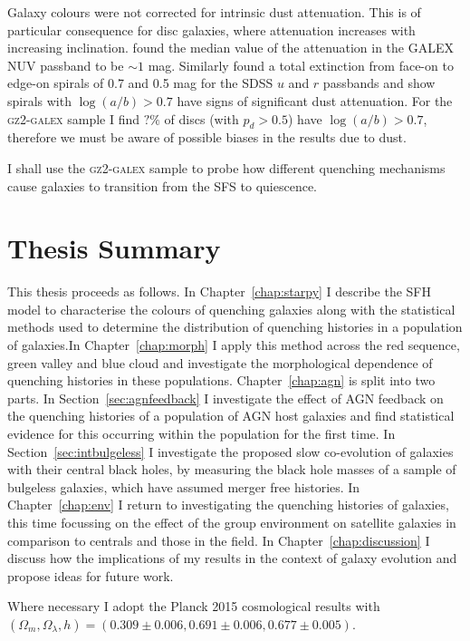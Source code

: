 Galaxy colours were not corrected for intrinsic dust attenuation. This is of particular consequence for disc galaxies, where attenuation increases with increasing inclination. \cite{Buat05} found the median value of the attenuation in the GALEX NUV passband to be $\sim 1$ mag. Similarly \cite{masters10a} found a total extinction from face-on to edge-on spirals of 0.7 and 0.5 mag for the SDSS $u$ and $r$ passbands and show spirals with $\log(a/b) > 0.7$ have signs of significant dust attenuation. For the \textsc{gz2-galex} sample I find $?\%$ of discs (with $p_d > 0.5$) have $\log(a/b) > 0.7$, therefore we must be aware of possible biases in the results due to dust. 

I shall use the \textsc{gz2-galex} sample to probe how different quenching mechanisms cause galaxies to transition from the SFS to quiescence. 


\section{Thesis Summary}\label{sec:thesissum}


This thesis proceeds as follows. In Chapter~\ref{chap:starpy} I describe the SFH model to characterise the colours of quenching galaxies along with the statistical methods used to determine the distribution of quenching histories in a population of galaxies.In Chapter~\ref{chap:morph} I apply this method across the red sequence, green valley and blue cloud and investigate the morphological dependence of quenching histories in these populations. Chapter~\ref{chap:agn} is split into two parts. In Section~\ref{sec:agnfeedback} I investigate the effect of AGN feedback on the quenching histories of a  population of AGN host galaxies and find statistical evidence for this occurring within the population for the first time. In Section~\ref{sec:intbulgeless} I investigate the proposed slow co-evolution of galaxies with their central black holes, by measuring the black hole masses of a sample of bulgeless galaxies, which have assumed merger free histories. In Chapter~\ref{chap:env} I return to investigating the quenching histories of galaxies, this time focussing on the effect of the group environment on satellite galaxies in comparison to centrals and those in the field. In Chapter~\ref{chap:discussion} I discuss how the implications of my results in the context of galaxy evolution and propose ideas for future work.

Where necessary I adopt the Planck 2015 cosmological results \citep{planck16} with $(\Omega_m, \Omega_{\lambda}, h) = (0.309 \pm 0.006, 0.691 \pm 0.006, 0.677 \pm 0.005)$. 

